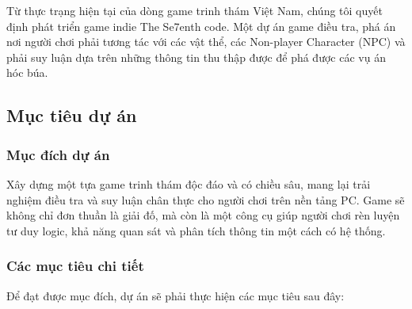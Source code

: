 Từ thực trạng hiện tại của dòng game trinh thám Việt Nam, chúng tôi quyết định phát triển game indie The Se7enth code. Một dự án game điều tra, phá án nơi người chơi phải tương tác với các vật thể, các Non-player Character (NPC) và phải suy luận dựa trên những thông tin thu thập được để phá được các vụ án hóc búa. 

\subsection{Mục tiêu dự án}
\subsubsection{Mục đích dự án}
Xây dựng một tựa game trinh thám độc đáo và có chiều sâu, mang lại trải nghiệm điều tra và suy luận chân thực cho người chơi trên nền tảng PC. Game sẽ không chỉ đơn thuần là giải đố, mà còn là một công cụ giúp người chơi rèn luyện tư duy logic, khả năng quan sát và phân tích thông tin một cách có hệ thống.

\subsubsection{Các mục tiêu chi tiết}
Để đạt được mục đích, dự án sẽ phải thực hiện các mục tiêu sau đây:


